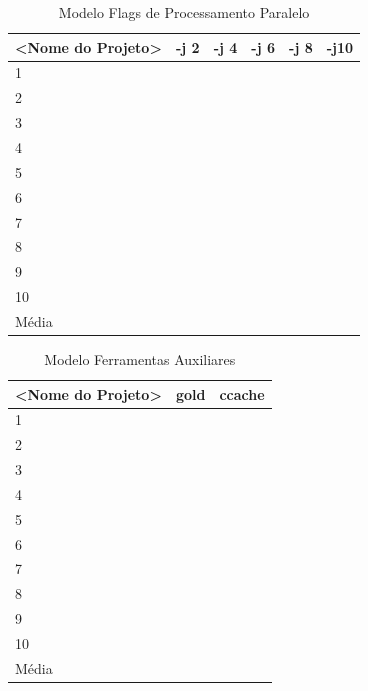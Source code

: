 \begin{table}[!ht]
\centering
\caption{Modelo Flags de Processamento Paralelo}
\label{tab:modelo_flag_processamento_paralelo}
\begin{tabular}{llllll}
\textbf{<Nome do Projeto>} & \textbf{-j 2} & \textbf{-j 4} & \textbf{-j 6} & \textbf{-j 8} & \textbf{-j10}  \\ \toprule
1                                    &    &     &     &     &        \\ 
2                                    &    &     &     &     &        \\ 
3                                    &    &     &     &     &        \\ 
4                                    &    &     &     &     &        \\ 
5                                    &    &     &     &     &        \\ 
6                                    &    &     &     &     &        \\ 
7                                    &    &     &     &     &        \\ 
8                                    &    &     &     &     &        \\ 
9                                    &    &     &     &     &        \\ 
10                                   &    &     &     &     &        \\ \bottomrule
Média                                &    &     &     &     &        \\ 
\end{tabular}
\end{table}

\begin{table}[!ht]
\centering
\caption{Modelo Ferramentas Auxiliares}
\label{tab:modelo_ferramentas_auxliares}
\begin{tabular}{lll}
\textbf{<Nome do Projeto>} & \textbf{gold} & \textbf{ccache}   \\ \toprule
1                                    &     &        \\ 
2                                    &     &        \\ 
3                                    &     &        \\ 
4                                    &     &        \\ 
5                                    &     &        \\ 
6                                    &     &        \\ 
7                                    &     &        \\ 
8                                    &     &        \\ 
9                                    &     &        \\ 
10                                   &     &        \\ \bottomrule
Média                                &     &        \\ 
\end{tabular}
\end{table}
